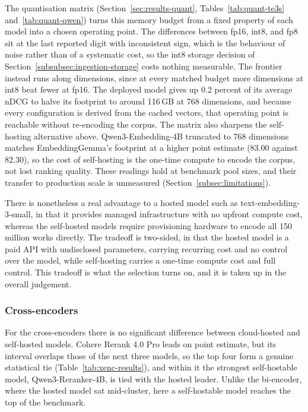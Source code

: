 The quantisation matrix (Section~\ref{sec:results-quant}, Tables~\ref{tab:quant-te3s} and~\ref{tab:quant-qwen}) turns this memory budget from a fixed property of each model into a chosen operating point. The differences between fp16, int8, and fp8 sit at the last reported digit with inconsistent sign, which is the behaviour of noise rather than of a systematic cost, so the int8 storage decision of Section~\ref{subsubsec:ingestion-storage} costs nothing measurable. The frontier instead runs along dimensions, since at every matched budget more dimensions at int8 beat fewer at fp16. The deployed model gives up 0.2 percent of its average nDCG to halve its footprint to around 116\,GB at 768 dimensions, and because every configuration is derived from the cached vectors, that operating point is reachable without re-encoding the corpus. The matrix also sharpens the self-hosting alternative above. Qwen3-Embedding-4B truncated to 768 dimensions matches EmbeddingGemma's footprint at a higher point estimate (83.00 against 82.30), so the cost of self-hosting is the one-time compute to encode the corpus, not lost ranking quality. These readings hold at benchmark pool sizes, and their transfer to production scale is unmeasured (Section~\ref{subsec:limitations}).

There is nonetheless a real advantage to a hosted model such as text-embedding-3-small, in that it provides managed infrastructure with no upfront compute cost, whereas the self-hosted models require provisioning hardware to encode all 150 million works directly. The tradeoff is two-sided, in that the hosted model is a paid API with undisclosed parameters, carrying recurring cost and no control over the model, while self-hosting carries a one-time compute cost and full control. This tradeoff is what the selection turns on, and it is taken up in the overall judgement.

\subsubsection{Cross-encoders}

For the cross-encoders there is no significant difference between cloud-hosted and self-hosted models. Cohere Rerank 4.0 Pro leads on point estimate, but its interval overlaps those of the next three models, so the top four form a genuine statistical tie (Table~\ref{tab:xenc-results}), and within it the strongest self-hostable model, Qwen3-Reranker-4B, is tied with the hosted leader. Unlike the bi-encoder, where the hosted model sat mid-cluster, here a self-hostable model reaches the top of the benchmark.

